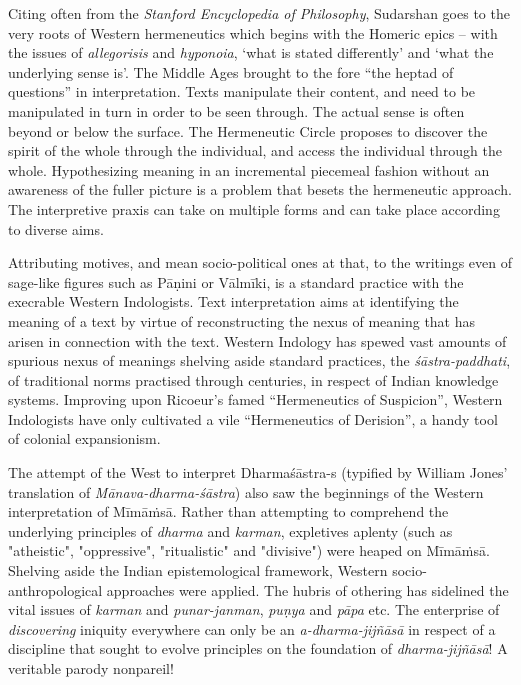 Citing often from the \textit{Stanford Encyclopedia of Philosophy}, Sudarshan goes to the very roots of Western hermeneutics which begins with the Homeric epics – with the issues of \textit{allegorisis} and \textit{hyponoia}, ‘what is stated differently’ and ‘what the underlying sense is’. The Middle Ages brought to the fore “the heptad of questions” in interpretation. Texts manipulate their content, and need to be manipulated in turn in order to be seen through. The actual sense is often beyond or below the surface. The Hermeneutic Circle proposes to discover the spirit of the whole through the individual, and access the individual through the whole. Hypothesizing meaning in an incremental piecemeal fashion without an awareness of the fuller picture is a problem that besets the hermeneutic approach. The interpretive praxis can take on multiple forms and can take place according to diverse aims.

 Attributing motives, and mean socio-political ones at that, to the writings even of sage-like figures such as Pāṇini or Vālmīki, is a standard practice with the execrable Western Indologists. Text interpretation aims at identifying the meaning of a text by virtue of reconstructing the nexus of meaning that has arisen in connection with the text. Western Indology has spewed vast amounts of spurious nexus of meanings shelving aside standard practices, the \textit{śāstra-paddhati}, of traditional norms practised through centuries, in respect of Indian knowledge systems. Improving upon Ricoeur’s famed “Hermeneutics of Suspicion”, Western Indologists have only cultivated a vile “Hermeneutics of Derision”, a handy tool of colonial expansionism. 

The attempt of the West to interpret Dharmaśāstra-s (typified by William Jones’ translation of \textit{Mānava-dharma-śāstra}) also saw the beginnings of the Western interpretation of Mīmāṁsā. Rather than attempting to comprehend the underlying principles of \textit{dharma} and \textit{karman}, expletives aplenty (such as "atheistic", "oppressive", "ritualistic" and "divisive") were heaped on Mīmāṁsā. Shelving aside the Indian epistemological framework, Western socio-anthropological approaches were applied. The hubris of othering has sidelined the vital issues of \textit{karman} and \textit{punar-janman}, \textit{puṇya} and \textit{pāpa} etc. The enterprise of \textit{discovering} iniquity everywhere can only be an \textit{a-dharma-jijñāsā} in respect of a discipline that sought to evolve principles on the foundation of \textit{dharma-jijñāsā}! A veritable parody nonpareil!

